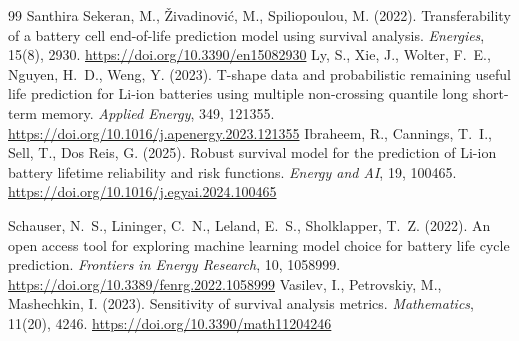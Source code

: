 \documentclass[preprint,12pt]{elsarticle}
\begin{document}
\begin{thebibliography}{99}
Santhira Sekeran, M., \v{Z}ivadinovi\'{c}, M., Spiliopoulou, M. (2022). Transferability of a battery cell end-of-life prediction model using survival analysis. \textit{Energies}, 15(8), 2930. \url{https://doi.org/10.3390/en15082930}
Ly, S., Xie, J., Wolter, F.~E., Nguyen, H.~D., Weng, Y. (2023). T-shape data and probabilistic remaining useful life prediction for Li-ion batteries using multiple non-crossing quantile long short-term memory. \textit{Applied Energy}, 349, 121355. \url{https://doi.org/10.1016/j.apenergy.2023.121355}
Ibraheem, R., Cannings, T.~I., Sell, T., Dos Reis, G. (2025). Robust survival model for the prediction of Li-ion battery lifetime reliability and risk functions. \textit{Energy and AI}, 19, 100465. \url{https://doi.org/10.1016/j.egyai.2024.100465}

Schauser, N.~S., Lininger, C.~N., Leland, E.~S., Sholklapper, T.~Z. (2022). An open access tool for exploring machine learning model choice for battery life cycle prediction. \textit{Frontiers in Energy Research}, 10, 1058999. \url{https://doi.org/10.3389/fenrg.2022.1058999}
Vasilev, I., Petrovskiy, M., Mashechkin, I. (2023). Sensitivity of survival analysis metrics. \textit{Mathematics}, 11(20), 4246. \url{https://doi.org/10.3390/math11204246}
\end{thebibliography}
\end{document}
